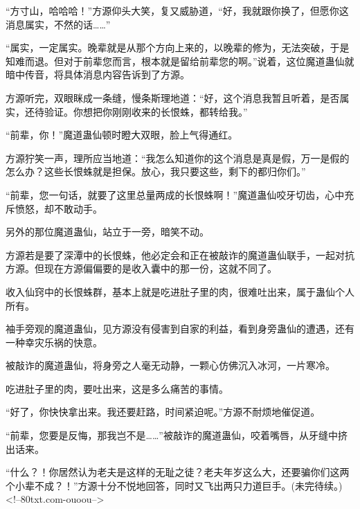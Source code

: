 \begin{this_body}
“方寸山，哈哈哈！”方源仰头大笑，复又威胁道，“好，我就跟你换了，但愿你这消息属实，不然的话……”

“属实，一定属实。晚辈就是从那个方向上来的，以晚辈的修为，无法突破，于是知难而退。但对于前辈您而言，根本就是留给前辈您的啊。”说着，这位魔道蛊仙就暗中传音，将具体消息内容告诉到了方源。

方源听完，双眼眯成一条缝，慢条斯理地道：“好，这个消息我暂且听着，是否属实，还待验证。你想把你刚刚收来的长恨蛛，都转给我。”

“前辈，你！”魔道蛊仙顿时瞪大双眼，脸上气得通红。

方源狞笑一声，理所应当地道：“我怎么知道你的这个消息是真是假，万一是假的怎么办？这些长恨蛛就是担保。放心，我只要这些，剩下的都归你们。”

“前辈，您一句话，就要了这里总量两成的长恨蛛啊！”魔道蛊仙咬牙切齿，心中充斥愤怒，却不敢动手。

另外的那位魔道蛊仙，站立于一旁，暗笑不动。

方源若是要了深潭中的长恨蛛，他必定会和正在被敲诈的魔道蛊仙联手，一起对抗方源。但现在方源偏偏要的是收入囊中的那一份，这就不同了。

收入仙窍中的长恨蛛群，基本上就是吃进肚子里的肉，很难吐出来，属于蛊仙个人所有。

袖手旁观的魔道蛊仙，见方源没有侵害到自家的利益，看到身旁蛊仙的遭遇，还有一种幸灾乐祸的快意。

被敲诈的魔道蛊仙，将身旁之人毫无动静，一颗心仿佛沉入冰河，一片寒冷。

吃进肚子里的肉，要吐出来，这是多么痛苦的事情。

“好了，你快快拿出来。我还要赶路，时间紧迫呢。”方源不耐烦地催促道。

“前辈，您要是反悔，那我岂不是……”被敲诈的魔道蛊仙，咬着嘴唇，从牙缝中挤出话来。

“什么？！你居然认为老夫是这样的无耻之徒？老夫年岁这么大，还要骗你们这两个小辈不成？！”方源十分不悦地回答，同时又飞出两只力道巨手。(未完待续。)<!--80txt.com-ouoou-->

\end{this_body}

